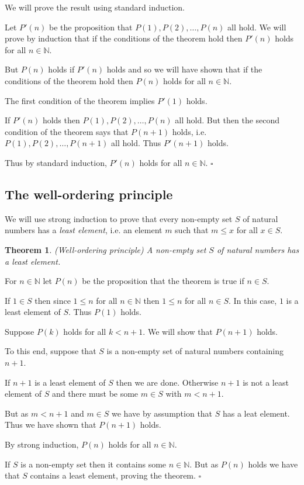 \documentclass[10pt]{article}
\newcommand{\N}{\mathbb{N}}
\newcommand{\qed}{\square}
\newtheorem{theorem}{Theorem}[section]
\newenvironment{proof}[1][Proof]{\begin{trivlist}
\item[\hskip \labelsep {\bfseries #1}]}{\end{trivlist}}
\begin{document}
\begin{proof}
We will prove the result using standard induction.

Let $P'(n)$ be the proposition that $P(1), P(2), \ldots, P(n)$ all hold. We will prove by induction that if the conditions of the theorem hold then $P'(n)$ holds for all $n \in \N$.

But $P(n)$ holds if $P'(n)$ holds and so we will have shown that if the conditions of the theorem hold then $P(n)$ holds for all $n \in \N$.

The first condition of the theorem implies $P'(1)$ holds.

If $P'(n)$ holds then $P(1), P(2), \ldots, P(n)$ all hold. But then the second condition of the theorem says that $P(n + 1)$ holds, i.e. $P(1), P(2), \ldots, P(n + 1)$ all hold. Thus $P'(n + 1)$ holds.

Thus by standard induction, $P'(n)$ holds for all $n \in \N$. $\qed$
\end{proof}

\subsection{The well-ordering principle}

We will use strong induction to prove that every non-empty set $S$ of natural numbers has a \emph{least element}, i.e. an element $m$ such that $m \leq x$ for all $x \in S$.


\begin{theorem} (Well-ordering principle)
A non-empty set $S$ of natural numbers has a least element.
\end{theorem}

\begin{proof}
For $n \in \N$ let $P(n)$ be the proposition that the theorem is true if $n \in S$.

If $1 \in S$ then since $1 \leq n$ for all $n \in \N$ then $1 \leq n$ for all $n \in S$. In this case, $1$ is a least element of $S$. Thus $P(1)$ holds.

Suppose $P(k)$ holds for all $k < n + 1$. We will show that $P(n + 1)$ holds.

To this end, suppose that $S$ is a non-empty set of natural numbers containing $n + 1$.

If $n + 1$ is a least element of $S$ then we are done. Otherwise $n + 1$ is not a least element of $S$ and there must be some $m \in S$ with $m < n + 1$.

But as $m < n + 1$ and $m \in S$ we have by assumption that $S$ has a leat element. Thus we have shown that $P(n + 1)$ holds.

By strong induction, $P(n)$ holds for all $n \in \N$.

If $S$ is a non-empty set then it contains some $n \in \N$. But as $P(n)$ holds we have that $S$ contains a least element, proving the theorem. $\qed$
\end{proof}
\end{document}
